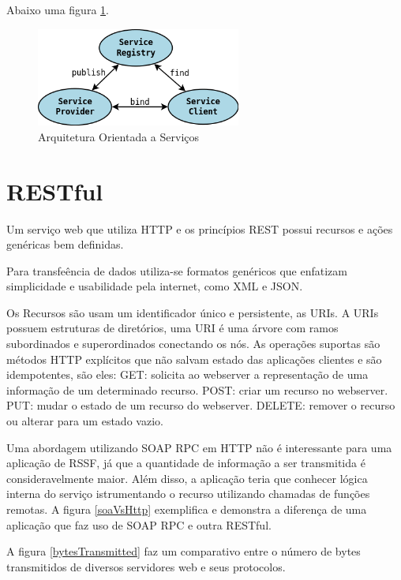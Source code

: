 Abaixo uma figura \ref{soaOverview}.

\begin{figure}[h]
   \label{soaOverview}
   \centering
   \includegraphics[width=0.6\textwidth]{figuras/soa.png}
   \caption{Arquitetura Orientada a Servi\c{c}os}
\end{figure}

\section{RESTful}

Um servi\c{c}o web que utiliza HTTP e os princ\'ipios REST possui recursos e a\c{c}\~oes gen\'ericas bem definidas.\cite{rest}

Para transfe\^encia de dados utiliza-se formatos gen\'ericos que enfatizam simplicidade e usabilidade pela internet, como XML e JSON.

Os Recursos s\~ao usam um identificador \'unico e persistente, as URIs. A URIs possuem estruturas de diret\'orios, uma URI \'e uma \'arvore com ramos subordinados e superordinados conectando os n\'os. As opera\c{c}\~oes suportas s\~ao m\'etodos HTTP expl\'icitos que n\~ao salvam estado das aplica\c{c}\~oes clientes e s\~ao idempotentes, s\~ao eles:
GET: solicita ao webserver a representa\c{c}\~ao de uma informa\c{c}\~ao de um determinado recurso.
POST: criar um recurso no webserver.
PUT: mudar o estado de um recurso do webserver.
DELETE: remover o recurso ou alterar para um estado vazio.

Uma abordagem utilizando SOAP RPC em HTTP n\~ao \'e interessante para uma aplica\c{c}\~ao de RSSF, j\'a que a quantidade de informa\c{c}\~ao a ser transmitida \'e consideravelmente maior. Al\'em disso, a aplica\c{c}\~ao teria que conhecer l\'ogica interna do servi\c{c}o istrumentando o recurso utilizando chamadas de fun\c{c}\~oes remotas. A figura \ref{soaVsHttp} exemplifica e demonstra a diferen\c{c}a de uma aplica\c{c}\~ao que faz uso de SOAP RPC e outra RESTful.\cite{richardson2008restful}

A figura \ref{bytesTransmitted} faz um comparativo entre o n\'umero de bytes transmitidos de diversos servidores web e seus protocolos.

